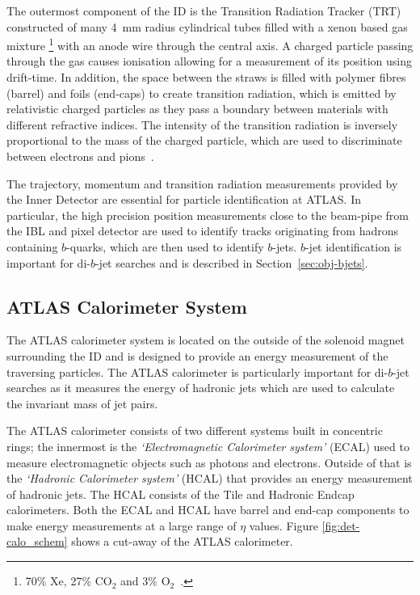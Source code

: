 The outermost component of the ID is the Transition Radiation Tracker (TRT)
constructed of many \SI{4}{\mm} radius cylindrical tubes filled with a xenon based gas mixture
\footnote{ 70\% Xe, 27\% $\text{CO}_2$ and 3\% $\text{O}_2$~\cite{det-ID_xe}.}
with an anode wire through the central axis.
A charged particle passing through the gas causes ionisation allowing for a measurement of its position using drift-time.
In addition, the space between the straws is filled with polymer fibres (barrel) and foils (end-caps) to create transition radiation,
which is emitted by relativistic charged particles as they pass a boundary between materials with different refractive indices.
The intensity of the transition radiation is inversely proportional to the mass of the charged particle,
which are used to discriminate between electrons and pions~\cite{det-ID_TR}.

The trajectory, momentum and transition radiation measurements provided by the Inner Detector are essential for particle identification at ATLAS.
In particular, the high precision position measurements close to the beam-pipe from the IBL and pixel detector
are used to identify tracks originating from hadrons containing $b$-quarks, which are then used to identify $b$-jets.
$b$-jet identification is important for di-$b$-jet searches and is described in Section~\ref{sec:obj-bjets}.

\subsection{ATLAS Calorimeter System}
\label{sec:det-calo}

The ATLAS calorimeter system is located on the outside of the solenoid magnet surrounding the ID and
is designed to provide an energy measurement of the traversing particles.
The ATLAS calorimeter is particularly important for di-$b$-jet searches as it measures the
energy of hadronic jets which are used to calculate the invariant mass of jet pairs. %

The ATLAS calorimeter consists of two different systems built in concentric rings;
the innermost is the \textit{`Electromagnetic Calorimeter system'} (ECAL) used to measure electromagnetic objects such as photons and electrons.
Outside of that is the \textit{`Hadronic Calorimeter system'} (HCAL) that provides an energy measurement of hadronic jets.
The HCAL consists of the Tile and Hadronic Endcap calorimeters.
Both the ECAL and HCAL have barrel and end-cap components to make energy measurements at a large range of $\eta$ values.
Figure \ref{fig:det-calo_schem} shows a cut-away of the ATLAS calorimeter.

